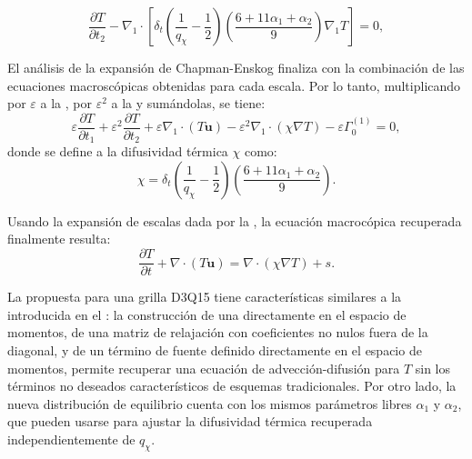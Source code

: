\begin{equation}
	\dfrac{\partial T}{\partial t_2} - \nabla_1 \cdot \left[ \delta_t \left( \dfrac{1}{q_{\chi}} - \dfrac{1}{2} \right) \left( \dfrac{6 + 11\alpha_1+\alpha_2}{9} \right) \nabla_1 T \right] = 0,
	\label{eq:eps2_T_3d}
\end{equation}

El an\'alisis de la expansi\'on de Chapman-Enskog finaliza con la combinaci\'on de las ecuaciones macrosc\'opicas obtenidas para cada escala. Por lo tanto, multiplicando por $\varepsilon$ a la , por $\varepsilon^2$ a la  y sum\'andolas, se tiene:
\begin{equation}
	\varepsilon \dfrac{\partial T}{\partial t_1} + \varepsilon^2 \dfrac{\partial T}{\partial t_2} + \varepsilon \nabla_1 \cdot (T\bm{u}) - \varepsilon^2 \nabla_1 \cdot (\chi \nabla T) - \varepsilon \Gamma_0^{(1)} = 0,
\end{equation}
donde se define a la difusividad t\'ermica $\chi$ como:
\begin{equation}
	\chi = \delta_t \left( \dfrac{1}{q_{\chi}} - \dfrac{1}{2} \right) \left( \dfrac{6 + 11\alpha_1+\alpha_2}{9} \right).
	\label{eq:modelo_3d_chi}
\end{equation}

Usando la expansi\'on de escalas dada por la , la ecuaci\'on macroc\'opica recuperada finalmente resulta:
\begin{equation}
	\dfrac{\partial T}{\partial t} + \nabla \cdot (T\bm{u}) = \nabla \cdot (\chi \nabla T) + s.
	\label{eq:T_3d}
\end{equation}

La \lbe{} propuesta para una grilla D3Q15 tiene caracter\'isticas similares a la introducida en el : la construcci\'on de una \edf{} directamente en el espacio de momentos, de una matriz de relajaci\'on con coeficientes no nulos fuera de la diagonal, y de un t\'ermino de fuente definido directamente en el espacio de momentos, permite recuperar una ecuaci\'on de advecci\'on-difusi\'on para $T$ sin los t\'erminos no deseados caracter\'isticos de esquemas tradicionales. Por otro lado, la nueva distribuci\'on de equilibrio cuenta con los mismos par\'ametros libres $\alpha_1$ y $\alpha_2$, que pueden usarse para ajustar la difusividad t\'ermica recuperada independientemente de $q_{\chi}$.

